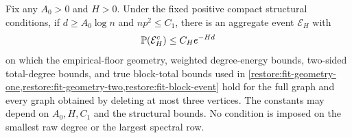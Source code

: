 \begin{lemma}
\label{restore:high-aggregate}
Fix any $A_0>0$ and $H>0$. Under the fixed positive compact structural
conditions, if $d\ge A_0\log n$ and $np^2\le C_1$, there is an aggregate
event $\mathcal E_H$ with
\[
 \mathbb P(\mathcal E_H^c)\le C_H e^{-Hd}
\]
on which the empirical-floor geometry, weighted degree-energy bounds,
two-sided total-degree bounds, and true block-total bounds used in
\cref{restore:fit-geometry-one,restore:fit-geometry-two,restore:fit-block-event}
hold for the full graph and every graph obtained by deleting at most three
vertices. The constants may depend on $A_0,H,C_1$ and the structural
bounds. No condition is imposed on the smallest raw degree or the
largest spectral row.
\end{lemma}


